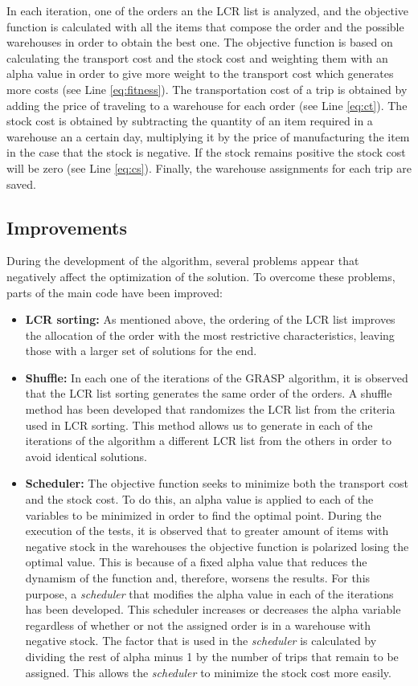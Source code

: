 \documentclass[letterpaper]{article} %
\begin{document}
In each iteration, one of the orders an the LCR list is analyzed, and the objective function is calculated with all the items that compose the order and the possible warehouses in order to obtain the best one. The objective function is based on calculating the transport cost and the stock cost and weighting them with an alpha value in order to give more weight to the transport cost which generates more costs (see Line \ref{eq:fitness}).
The transportation cost of a trip is obtained by adding the price of traveling to a warehouse for each order (see Line \ref{eq:ct}). The stock cost is obtained by subtracting the quantity of an item required in a warehouse an a certain day, multiplying it by the price of manufacturing the item in the case that the stock is negative. If the stock remains positive the stock cost will be zero (see Line \ref{eq:cs}). Finally, the warehouse assignments for each trip are saved.

\subsection*{Improvements}
During the development of the algorithm, several problems appear that negatively affect the optimization of the solution. To overcome these problems, parts of the main code have been improved:
\begin{itemize}
    \item \textbf{LCR sorting:} As mentioned above, the ordering of the LCR list improves the allocation of the order with the most restrictive characteristics, leaving those with a larger set of solutions for the end.
    \item \textbf{Shuffle:} In each one of the iterations of the GRASP algorithm, it is observed that the LCR list sorting generates the same order of the orders. A shuffle method has been developed that randomizes the LCR list from the criteria used in LCR sorting. This method allows us to generate in each of the iterations of the algorithm a different LCR list from the others in order to avoid identical solutions.
    \item \textbf{Scheduler:} The objective function seeks to minimize both the transport cost and the stock cost. To do this, an alpha value is applied to each of the variables to be minimized in order to find the optimal point. During the execution of the tests, it is observed that to greater amount of items with negative stock in the warehouses the objective function is polarized losing the optimal value. This is because of a fixed alpha value that reduces the dynamism of the function and, therefore, worsens the results. For this purpose, a \textit{scheduler} that modifies the alpha value in each of the iterations has been developed. This scheduler increases or decreases the alpha variable regardless of whether or not the assigned order is in a warehouse with negative stock. The factor that is used in the \textit{scheduler} is calculated by dividing the rest of alpha minus 1 by the number of trips that remain to be assigned. This allows the \textit{scheduler} to minimize the stock cost more easily.
\end{itemize}
\end{document}
